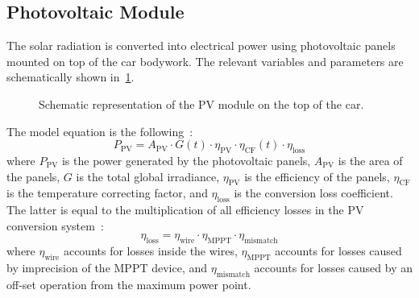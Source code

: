 \subsection{Photovoltaic Module}
\label{sec:modelPV}
The solar radiation is converted into electrical power using photovoltaic panels mounted on top of the car bodywork. The relevant variables and parameters are schematically shown in~\cref{fig:PVmodel}.
\begin{figure}[htbp]
	\centering
	
	\caption{Schematic representation of the PV module on the top of the car.}
	\label{fig:PVmodel}
\end{figure}

The model equation is the following~\cite{PVmodelling:2022misc}:
\begin{equation}
	P_\mathrm{PV} = A_\mathrm{PV} \cdot G(t) \cdot \eta_\mathrm{PV} \cdot \eta_\mathrm{CF}(t) \cdot \eta_\mathrm{loss}
\end{equation}
where $P_\mathrm{PV}$ is the power generated by the photovoltaic panels, $A_\mathrm{PV}$ is the area of the panels, $G$ is the total global irradiance, $\eta_\mathrm{PV}$ is the efficiency of the panels, $\eta_\mathrm{CF}$ is the temperature correcting factor, and $\eta_\mathrm{loss}$ is the conversion loss coefficient. The latter is equal to the multiplication of all efficiency losses in the PV conversion system~\cite{PVlosses:2017article}:
\begin{equation}
	\eta_\mathrm{loss} = \eta_\mathrm{wire} \cdot \eta_\mathrm{MPPT} \cdot \eta_\mathrm{mismatch}
\end{equation}
where $\eta_\mathrm{wire}$ accounts for losses inside the wires, $\eta_\mathrm{MPPT}$ accounts for losses caused by imprecision of the MPPT device, and $\eta_\mathrm{mismatch}$ accounts for losses caused by an off-set operation from the maximum power point.

